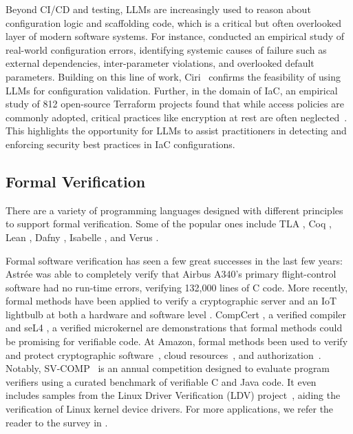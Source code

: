 Beyond CI/CD and testing, LLMs are increasingly used to reason about configuration logic and scaffolding code, which is a critical but often overlooked layer of modern software systems. 
For instance, \citet{yin2011configuration} conducted an empirical study of real-world configuration errors, identifying systemic causes of failure such as external dependencies, inter-parameter violations, and overlooked default parameters. 
Building on this line of work, Ciri~\citep{lian2024large} confirms the feasibility of using LLMs for configuration validation.
Further, in the domain of IaC, an empirical study of 812 open-source Terraform projects found that while access policies are commonly adopted, critical practices like encryption at rest are often neglected~\citep{verdet2023exploring}. 
This highlights the opportunity for LLMs to assist practitioners in detecting and enforcing security best practices in IaC configurations.


\subsection{Formal Verification}
There are a variety of programming languages designed with different principles to support formal verification. Some of the popular ones include TLA \citep{lamport1994introduction}, Coq \citep{Coq-refman}, Lean \citep{de2015lean}, Dafny \citep{leino2010dafny}, Isabelle \citep{nipkow2002isabelle}, and Verus \citep{lattuada2024verus}. 

Formal software verification has seen a few great successes in the last few years: Astrée \citep{cousot2005astree} was able to completely verify that Airbus A340's primary flight-control software had no run-time errors, verifying 132,000 lines of C code. 
More recently, formal methods have been applied to verify a cryptographic server \citep{erbsen2024foundational} and an IoT lightbulb at both a hardware and software level \citep{erbsen2021integration}. 
CompCert \citep{leroy2016compcert}, a verified compiler and seL4 \citep{klein2009sel4}, a verified microkernel are demonstrations that formal methods could be promising for verifiable code. 
At Amazon, formal methods been used to verify and protect cryptographic software~\citep{goel2024leanprover}, cloud resources~\citep{xu2024cloud}, and authorization~\citep{disselkoen2025cedar}. 
Notably, SV-COMP~\citep{beyer2023svcomp} is an annual competition designed to evaluate program verifiers using a curated benchmark of verifiable C and Java code. 
It even includes samples from the Linux Driver Verification (LDV) project~\citep{beyer2012ldv}, aiding the verification of Linux kernel device drivers.
For more applications, we refer the reader to the survey in \citet{huang2023lessons}.

